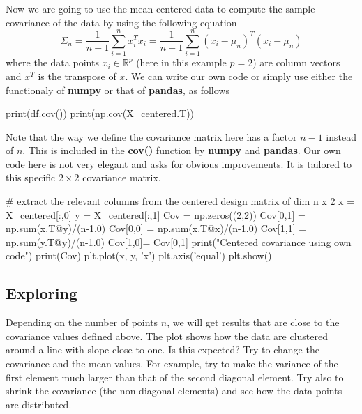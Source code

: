 \documentclass[%
oneside,                 %
final,                   %
10pt]{article}
\begin{document}
Now we are going to use the mean centered data to compute the sample covariance of the data by using the following equation
\begin{equation*}
\Sigma_n = \frac{1}{n-1} \sum_{i=1}^n \bar{x}_i^T \bar{x}_i = \frac{1}{n-1} \sum_{i=1}^n (x_i - \mu_n)^T (x_i - \mu_n)
\end{equation*}
where the data points $x_i \in \mathbb{R}^p$ (here in this example $p = 2$) are column vectors and $x^T$ is the transpose of $x$.
We can write our own code or simply use either the functionaly of \textbf{numpy} or that of \textbf{pandas}, as follows



\bpycod
print(df.cov())
print(np.cov(X_centered.T))

\epycod

Note that the way we define the covariance matrix here has a factor $n-1$ instead of $n$. This is included in the \textbf{cov()} function by \textbf{numpy} and \textbf{pandas}. 
Our own code here is not very elegant and asks for obvious improvements. It is tailored to this specific $2\times 2$ covariance matrix. 














\bpycod
# extract the relevant columns from the centered design matrix of dim n x 2
x = X_centered[:,0]
y = X_centered[:,1]
Cov = np.zeros((2,2))
Cov[0,1] = np.sum(x.T@y)/(n-1.0)
Cov[0,0] = np.sum(x.T@x)/(n-1.0)
Cov[1,1] = np.sum(y.T@y)/(n-1.0)
Cov[1,0]= Cov[0,1]
print("Centered covariance using own code")
print(Cov)
plt.plot(x, y, 'x')
plt.axis('equal')
plt.show()

\epycod


\subsection{Exploring}

Depending on the number of points $n$, we will get results that are close to the covariance values defined above.
The plot shows how the data are clustered around a line with slope close to one. Is this expected?  Try to change the covariance and the mean values. For example, try to make the variance of the first element much larger than that of the second diagonal element. Try also to shrink the covariance  (the non-diagonal elements) and see how the data points are distributed. 
\end{document}
